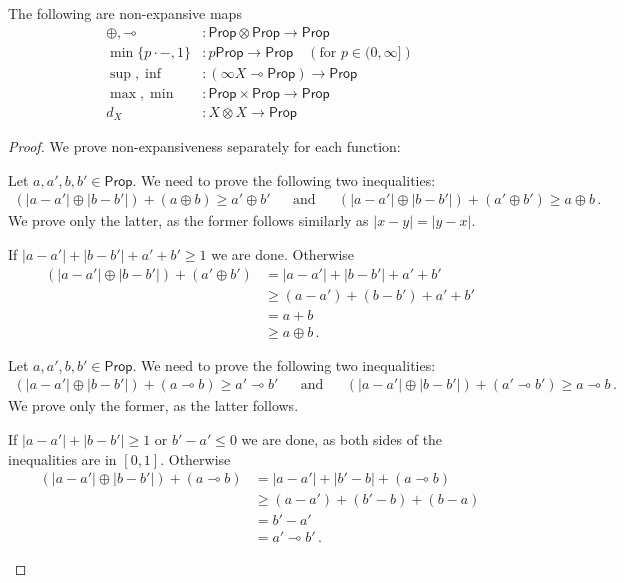 \documentclass[a4paper,UKenglish,cleveref, autoref, thm-restate]{lipics-v2021}
\newcommand{\lol}{\mathbin{\multimap}}
\newcommand{\mprod}{\otimes}
\newcommand{\mexp}{\lol}
\newcommand{\scaling}{}
\newcommand{\Prop}{\mathsf{Prop}}
\begin{document}
\begin{lemma}
The following are non-expansive maps
\begin{align*}
 {\oplus}, {\lol} &\colon  \Prop \mprod \Prop \to \Prop \\
 \min\{p\cdot -, 1\} &\colon p \scaling \Prop \to \Prop   \quad (\text{for $p \in (0,\infty]$})\\
 {\sup}, {\inf} &\colon (\infty \scaling X \mexp \Prop) \to \Prop \\
 \max, \min &\colon \Prop \times \Prop \to \Prop \\
 d_X &\colon X \mprod X \to \Prop
\end{align*}
\end{lemma}
\begin{proof}
We prove non-expansiveness separately for each function:
\begin{description}[font=\sc,wide]
    \item[Case $\oplus$:]
    Let $a,a',b,b'\in \Prop$. We need to prove the following two inequalities:
    \begin{align*}
        (|a - a'| \oplus |b-b'|) + (a\oplus b) \geq a' \oplus b'
        &&\text{and}&&
        (|a - a'| \oplus |b-b'|) + (a'\oplus b') \geq a \oplus b \,.
    \end{align*}
    We prove only the latter, as the former follows similarly as $|x - y| = |y - x|$.
    
    If $|a - a'| + |b-b'| + a'+b' \geq 1$ we are done. Otherwise 
    \begin{align*}
        (|a - a'| \oplus |b-b'|) + (a' \oplus b')
        &= |a - a'| + |b-b'| + a'+b' \\
        &\geq (a - a') + (b-b') + a'+b' \\
        &=  a+b \\
        &\geq a \oplus b \,.
    \end{align*}   

    \item[Case $\lol$:]
    Let $a,a',b,b'\in \Prop$. We need to prove the following two inequalities:
    \begin{align*}
        (|a - a'| \oplus |b-b'|) + (a\lol b) \geq a' \lol b'
        &&\text{and}&&
        (|a - a'| \oplus |b-b'|) + (a'\lol b') \geq a \lol b \,.
    \end{align*}
    We prove only the former, as the latter follows.

    If $|a - a'| + |b-b'| \geq 1$ or $b'- a' \leq 0$ we are done, as both sides of the inequalities are in $[0,1]$. Otherwise 
    \begin{align*}
        (|a - a'| \oplus |b-b'|) + (a \lol b)
        &= |a - a'| + |b'-b| + (a \lol b) \\
        &\geq  (a - a') + (b'-b) + (b - a) \\
        &=  b'- a' \\
        &= a' \lol b' \,.
    \end{align*}


\end{description}
\end{proof}
\end{document}
